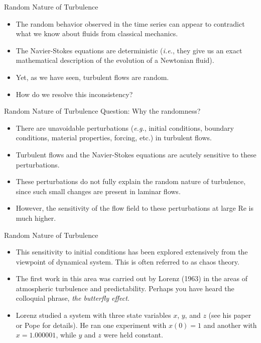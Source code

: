 \begin{frame}{Random Nature of Turbulence}
  \begin{itemize}
  	\item The random behavior observed in the time series can appear to contradict what we know about fluids from classical mechanics.
  	\item The Navier-Stokes equations are deterministic (\textit{i.e.}, they give us an exact mathematical description of the evolution of a Newtonian fluid).
  	\item Yet, as we have seen, turbulent flows are random.
  	\item How do we resolve this inconsistency?
  \end{itemize}
\end{frame}


\begin{frame}{Random Nature of Turbulence}
  Question: Why the randomness?
  \begin{itemize}
  	\item There are unavoidable perturbations (\textit{e.g.}, initial conditions, boundary conditions, material properties, forcing, etc.) in turbulent flows.
  	\item Turbulent flows and the Navier-Stokes equations are acutely sensitive to these perturbations.
  	\item These perturbations do not fully explain the random nature of turbulence, since such small changes are present in laminar flows.
  	\item However, the sensitivity of the flow field to these perturbations at large Re is much higher.
  \end{itemize}
\end{frame}


\begin{frame}{Random Nature of Turbulence}
  \begin{itemize}
  	\item This sensitivity to initial conditions has been explored extensively from the viewpoint of dynamical system. This is often referred to as chaos theory.
  	\item The first work in this area was carried out by Lorenz (1963) in the areas of atmospheric turbulence and predictability. Perhaps you have heard the colloquial phrase, \textit{the butterfly effect}.
  	\item Lorenz studied a system with three state variables $x$, $y$, and $z$ (see his paper or Pope for details). He ran one experiment with $x(0) = 1$ and another with $x=1.000001$, while $y$ and $z$ were held constant.
  \end{itemize}
\end{frame}


